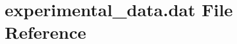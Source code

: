 \hypertarget{experimental__data_8dat}{}\section{experimental\+\_\+data.\+dat File Reference}
\label{experimental__data_8dat}
